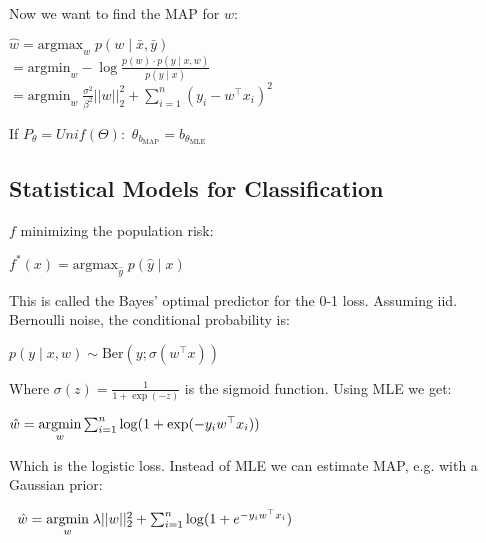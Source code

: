Now we want to find the MAP for $w$:

$\hat w = \text{argmax}_w \; p(w \; | \; \bar x, \bar y) $ \\[-5pt]

\quad $= \text{argmin}_w - \log \frac{p(w) \cdot p( y \; | \; x, w)}{p( y \; | \; x)} $ \\[-5pt]

\quad $= \text{argmin}_w \; \frac{\sigma^2}{\beta^2} ||w||_2^2 + \sum_{i=1}^n(y_i - w^\top x_i)^2$

If $P_\theta = Unif(\Theta): $ $\theta_{b_{\text{MAP}}} = b_{\theta_{\text{MLE}}}$

\subsection*{Statistical Models for Classification}

$f$ minimizing the population risk:

\qquad \qquad $f^*(x) = \text{argmax}_{\hat y} \; p(\hat y \; | \; x)$

This is called the Bayes' optimal predictor for the 0-1 loss. Assuming iid. Bernoulli noise, the conditional probability is:

\qquad \qquad$p(y \; | \; x,w) \sim \text{Ber}(y; \sigma(w^\top x))$

Where $\sigma(z) = \frac{1}{1 + \exp(-z)}$ is the sigmoid function. Using MLE we get:

\quad \;$\hat w = \underset{w}{\text{argmin}} \sum_{i = 1}^n \log (1 + \exp(-y_i w^\top x_i))$

Which is the logistic loss. Instead of MLE we can estimate MAP, e.g. with a Gaussian prior:

$\; \;\hat w = \underset{w}{\text{argmin}} \; \lambda ||w||_2^2 + \sum_{i = 1}^n \log (1 + e^{-y_i w^\top x_i})$






